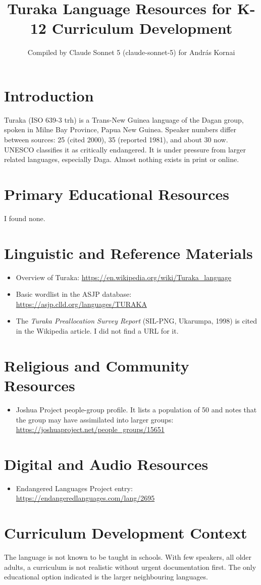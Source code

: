 \documentclass[12pt]{article}
\title{Turaka Language Resources for K-12 Curriculum Development}
\author{Compiled by Claude Sonnet 5 (claude-sonnet-5) for Andr\'as Kornai}
\date{}
\begin{document}
\maketitle
\section{Introduction}
Turaka (ISO 639-3 trh) is a Trans-New Guinea language of the Dagan group, spoken in Milne Bay Province, Papua New Guinea. Speaker numbers differ between sources: 25 (cited 2000), 35 (reported 1981), and about 30 now. UNESCO classifies it as critically endangered. It is under pressure from larger related languages, especially Daga. Almost nothing exists in print or online.
\section{Primary Educational Resources}
I found none.
\section{Linguistic and Reference Materials}
\begin{itemize}
\item Overview of Turaka: \url{https://en.wikipedia.org/wiki/Turaka_language}
\item Basic wordlist in the ASJP database: \url{https://asjp.clld.org/languages/TURAKA}
\item The \emph{Turaka Preallocation Survey Report} (SIL-PNG, Ukarumpa, 1998) is cited in the Wikipedia article. I did not find a URL for it.
\end{itemize}
\section{Religious and Community Resources}
\begin{itemize}
\item Joshua Project people-group profile. It lists a population of 50 and notes that the group may have assimilated into larger groups: \url{https://joshuaproject.net/people_groups/15651}
\end{itemize}
\section{Digital and Audio Resources}
\begin{itemize}
\item Endangered Languages Project entry: \url{https://endangeredlanguages.com/lang/2695}
\end{itemize}
\section{Curriculum Development Context}
The language is not known to be taught in schools. With few speakers, all older adults, a curriculum is not realistic without urgent documentation first. The only educational option indicated is the larger neighbouring languages.
\end{document}
